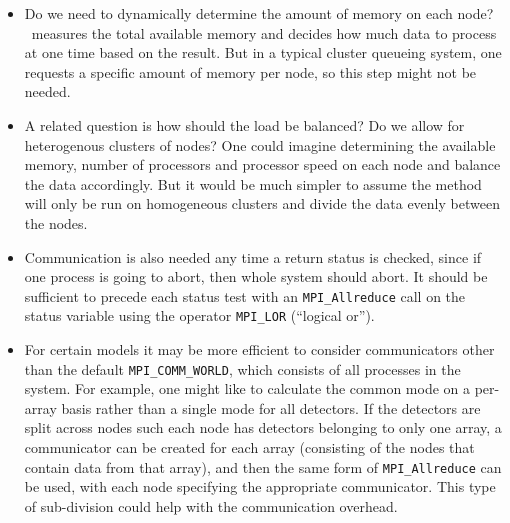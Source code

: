 \documentclass[oneside,11pt]{starlink}
\begin{document}
\begin{itemize}

\item Do we need to dynamically determine the amount of memory on each
  node? \makemap\ measures the total available memory and decides how
  much data to process at one time based on the result. But in a
  typical cluster queueing system, one requests a specific amount of
  memory per node, so this step might not be needed.

\item A related question is how should the load be balanced? Do we
  allow for heterogenous clusters of nodes? One could imagine
  determining the available memory, number of processors and processor
  speed on each node and balance the data accordingly. But it would
  be much simpler to assume the method will only be run on homogeneous
  clusters and divide the data evenly between the nodes.

\item Communication is also needed any time a return status is
  checked, since if one process is going to abort, then whole system
  should abort. It should be sufficient to precede each status test
  with an \verb+MPI_Allreduce+ call on the status variable using the
  operator \verb+MPI_LOR+ (``logical or'').

\item For certain models it may be more efficient to consider
  communicators other than the default \verb+MPI_COMM_WORLD+, which
  consists of all processes in the system. For example, one might like
  to calculate the common mode on a per-array basis rather than a
  single mode for all detectors. If the detectors are split across
  nodes such each node has detectors belonging to only one array, a
  communicator can be created for each array (consisting of the nodes
  that contain data from that array), and then the same form
  of \verb+MPI_Allreduce+ can be used, with each node specifying the
  appropriate communicator. This type of sub-division could help with
  the communication overhead.

\end{itemize}
\end{document}
